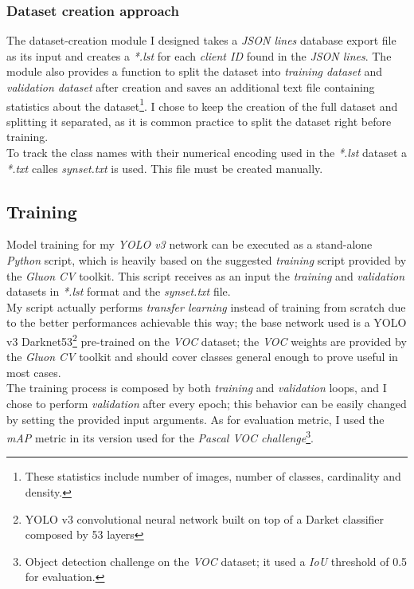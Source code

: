 \subsubsection{Dataset creation approach}
The dataset-creation module I designed takes a \emph{JSON lines} database export file as its input and creates a \emph{*.lst} for each \emph{client ID} found in the \emph{JSON lines}. The module also provides a function to split the dataset into \emph{training dataset} and \emph{validation dataset} after creation and saves an additional text file containing statistics about the dataset\footnote{These statistics include number of images, number of classes, cardinality and density.}. I chose to keep the creation of the full dataset and splitting it separated, as it is common practice to split the dataset right before training. \\
To track the class names with their numerical encoding used in the \emph{*.lst} dataset a \emph{*.txt} calles \emph{synset.txt} is used. This file must be created manually.


\subsection{Training}
Model training for my \emph{YOLO v3} network can be executed as a stand-alone \emph{Python} script, which is heavily based on the suggested \emph{training} script provided by the \emph{Gluon CV} toolkit. This script receives as an input the \emph{training} and \emph{validation} datasets in \emph{*.lst} format and the \emph{synset.txt} file. \\
My script actually performs \emph{transfer learning} instead of training from scratch due to the better performances achievable this way; the base network used is a YOLO v3 Darknet53\footnote{YOLO v3 convolutional neural network built on top of a Darket classifier composed by 53 layers} pre-trained on the \emph{VOC} dataset; the \emph{VOC} weights are provided by the \emph{Gluon CV} toolkit and should cover classes general enough to prove useful in most cases. \\
The training process is composed by both \emph{training} and \emph{validation} loops, and I chose to perform \emph{validation} after every epoch; this behavior can be easily changed by setting the provided input arguments. As for evaluation metric, I used the \emph{mAP} metric in its version used for the \emph{Pascal VOC challenge}\footnote{Object detection challenge on the \emph{VOC} dataset; it used a \emph{IoU} threshold of 0.5 for evaluation.}.

